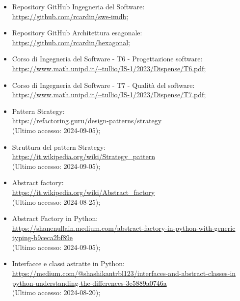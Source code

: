 \begin{itemize}
  \item Repository GitHub Ingegneria del Software:\\ \href{https://github.com/rcardin/swe-imdb}{https://github.com/rcardin/swe-imdb};
  \item Repository GitHub Architettura esagonale:\\ \href{https://github.com/rcardin/hexagonal}{https://github.com/rcardin/hexagonal};
  \item Corso di Ingegneria del Software - T6 - Progettazione software:\\ \href{https://www.math.unipd.it/~tullio/IS-1/2023/Dispense/T6.pdf}{https://www.math.unipd.it/\textasciitilde tullio/IS-1/2023/Dispense/T6.pdf};
  \item Corso di Ingegneria del Software - T7 - Qualità del software:\\ \href{https://www.math.unipd.it/~tullio/IS-1/2023/Dispense/T7.pdf}{https://www.math.unipd.it/\textasciitilde tullio/IS-1/2023/Dispense/T7.pdf};
  \item Pattern Strategy:\\ \href{https://refactoring.guru/design-patterns/strategy}{https://refactoring.guru/design-patterns/strategy} \\ (Ultimo accesso: 2024-09-05);
  \item Struttura del pattern Strategy:\\ \href{https://it.wikipedia.org/wiki/Strategy_pattern}{https://it.wikipedia.org/wiki/Strategy\_pattern} \\ (Ultimo accesso: 2024-09-05);
  \item Abstract factory:\\ \href{https://it.wikipedia.org/wiki/Abstract_factory}{https://it.wikipedia.org/wiki/Abstract\_factory} \\ (Ultimo accesso: 2024-08-25);
  \item Abstract Factory in Python:\\ \href{https://shanenullain.medium.com/abstract-factory-in-python-with-generic-typing-b9ceca2bf89e}{https://shanenullain.medium.com/abstract-factory-in-python-with-generic \- typing-b9ceca2bf89e} \\ (Ultimo accesso: 2024-09-05);
  \item Interfacce e classi astratte in Python:\\ \href{https://medium.com/@shashikantrbl123/interfaces-and-abstract-classes-in-python-understanding-the-differences-3e5889a0746a}{https://medium.com/@shashikantrbl123/interfaces-and-abstract-classes-in \- python-understanding-the-differences-3e5889a0746a} \\ (Ultimo accesso: 2024-08-20);

\end{itemize}
